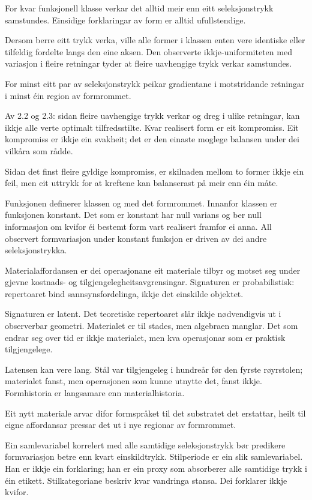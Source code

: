 \documentclass[10pt,oneside]{book}
\newlength{\propnumwidth}
\newlength{\propnumgap}
\newcommand{\prop}[3]{%
  \par\addvspace{6pt}%
  \noindent\llap{\makebox[\propnumwidth][l]{\textbf{#1}\textsuperscript{\textit{#2}}}\hspace{\propnumgap}}%
  #3\par%
  \addvspace{2pt}%
}
\begin{document}
\prop{2.2}{a}{For kvar funksjonell klasse verkar det alltid meir enn eitt seleksjonstrykk samstundes. Einsidige forklaringar av form er alltid ufullstendige.}
\prop{2.21}{t}{Dersom berre eitt trykk verka, ville alle former i klassen enten vere identiske eller tilfeldig fordelte langs den eine aksen. Den observerte ikkje-uniformiteten med variasjon i fleire retningar tyder at fleire uavhengige trykk verkar samstundes.}
\prop{2.3}{a}{For minst eitt par av seleksjonstrykk peikar gradientane i motstridande retningar i minst éin region av formrommet.}
\prop{2.4}{t}{Av 2.2 og 2.3: sidan fleire uavhengige trykk verkar og dreg i ulike retningar, kan ikkje alle verte optimalt tilfredsstilte. Kvar realisert form er eit kompromiss. Eit kompromiss er ikkje ein svakheit; det er den einaste moglege balansen under dei vilkåra som rådde.}
\prop{2.41}{t}{Sidan det finst fleire gyldige kompromiss, er skilnaden mellom to former ikkje ein feil, men eit uttrykk for at kreftene kan balanserast på meir enn éin måte.}
\prop{2.5}{t}{Funksjonen definerer klassen og med det formrommet. Innanfor klassen er funksjonen konstant. Det som er konstant har null varians og ber null informasjon om kvifor éi bestemt form vart realisert framfor ei anna. All observert formvariasjon under konstant funksjon er driven av dei andre seleksjonstrykka.}
\prop{2.6}{d}{Materialaffordansen er dei operasjonane eit materiale tilbyr og motset seg under gjevne kostnads- og tilgjengelegheitsavgrensingar. Signaturen er probabilistisk: repertoaret bind sannsynsfordelinga, ikkje det einskilde objektet.}
\prop{2.61}{o}{Signaturen er latent. Det teoretiske repertoaret slår ikkje nødvendigvis ut i observerbar geometri. Materialet er til stades, men algebraen manglar. Det som endrar seg over tid er ikkje materialet, men kva operasjonar som er praktisk tilgjengelege.}
\prop{2.62}{o}{Latensen kan vere lang. Stål var tilgjengeleg i hundreår før den fyrste røyrstolen; materialet fanst, men operasjonen som kunne utnytte det, fanst ikkje. Formhistoria er langsamare enn materialhistoria.}
\prop{2.63}{o}{Eit nytt materiale arvar difor formspråket til det substratet det erstattar, heilt til eigne affordansar pressar det ut i nye regionar av formrommet.}
\prop{2.7}{o}{Ein samlevariabel korrelert med alle samtidige seleksjonstrykk bør predikere formvariasjon betre enn kvart einskildtrykk. Stilperiode er ein slik samlevariabel. Han er ikkje ein forklaring; han er ein proxy som absorberer alle samtidige trykk i éin etikett. Stilkategoriane beskriv kvar vandringa stansa. Dei forklarer ikkje kvifor.}
\clearpage
{}
\end{document}
